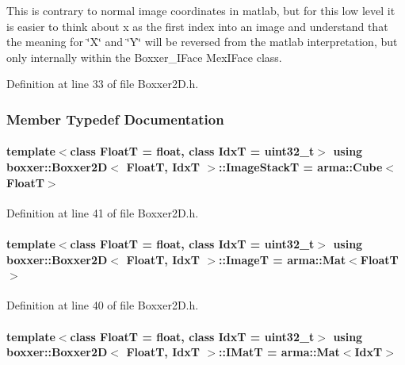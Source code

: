 This is contrary to normal image coordinates in matlab, but for this low level it is easier to think about x as the first index into an image and understand that the meaning for \char`\"{}\+X\char`\"{} and \char`\"{}\+Y\char`\"{} will be reversed from the matlab interpretation, but only internally within the Boxxer\+\_\+\+I\+Face Mex\+I\+Face class. 

Definition at line 33 of file Boxxer2\+D.\+h.



\subsubsection{Member Typedef Documentation}
\paragraph[{\texorpdfstring{Image\+StackT}{ImageStackT}}]{\setlength{\rightskip}{0pt plus 5cm}template$<$class FloatT  = float, class IdxT  = uint32\+\_\+t$>$ using {\bf boxxer\+::\+Boxxer2D}$<$ FloatT, IdxT $>$\+::{\bf Image\+StackT} =  arma\+::\+Cube$<$FloatT$>$}\hypertarget{classboxxer_1_1Boxxer2D_a35da86be183f5f24cb3d13cbf7cf45ee}{}\label{classboxxer_1_1Boxxer2D_a35da86be183f5f24cb3d13cbf7cf45ee}


Definition at line 41 of file Boxxer2\+D.\+h.

\paragraph[{\texorpdfstring{ImageT}{ImageT}}]{\setlength{\rightskip}{0pt plus 5cm}template$<$class FloatT  = float, class IdxT  = uint32\+\_\+t$>$ using {\bf boxxer\+::\+Boxxer2D}$<$ FloatT, IdxT $>$\+::{\bf ImageT} =  arma\+::\+Mat$<$FloatT$>$}\hypertarget{classboxxer_1_1Boxxer2D_ad1c52f05a957159bf373b4d8c4361ffe}{}\label{classboxxer_1_1Boxxer2D_ad1c52f05a957159bf373b4d8c4361ffe}


Definition at line 40 of file Boxxer2\+D.\+h.

\paragraph[{\texorpdfstring{I\+MatT}{IMatT}}]{\setlength{\rightskip}{0pt plus 5cm}template$<$class FloatT  = float, class IdxT  = uint32\+\_\+t$>$ using {\bf boxxer\+::\+Boxxer2D}$<$ FloatT, IdxT $>$\+::{\bf I\+MatT} =  arma\+::\+Mat$<$IdxT$>$}\hypertarget{classboxxer_1_1Boxxer2D_ad6e571d3e7685b8c634661e03382a32f}{}\label{classboxxer_1_1Boxxer2D_ad6e571d3e7685b8c634661e03382a32f}


